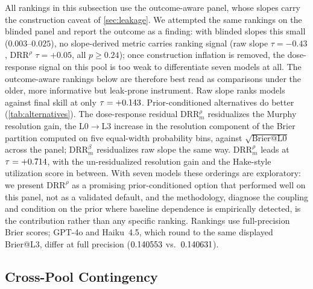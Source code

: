 \documentclass[conference]{IEEEtran}
\theoremstyle{plain}
\theoremstyle{remark}
\begin{document}
All rankings in this subsection use the outcome-aware panel, whose slopes carry the construction caveat of \cref{sec:leakage}. We attempted the same rankings on the blinded panel and report the outcome as a finding: with blinded slopes this small ($0.003$--$0.025$), no slope-derived metric carries ranking signal (raw slope $\tau = -0.43$, $\mathrm{DRR}^{\rho}$ $\tau = +0.05$, all $p \ge 0.24$); once construction inflation is removed, the dose-response signal on this pool is too weak to differentiate seven models at all. The outcome-aware rankings below are therefore best read as comparisons under the older, more informative but leak-prone instrument. Raw slope ranks models against final skill at only $\tau = +0.143$. Prior-conditioned alternatives do better (\cref{tab:alternatives}). The dose-response residual $\mathrm{DRR}^{\rho}_m$ residualizes the Murphy resolution gain, the L0$\to$L3 increase in the resolution component of the Brier partition \citep{murphy1973vector} computed on five equal-width probability bins, against $\sqrt{\mathrm{Brier@L0}}$ across the panel; $\mathrm{DRR}^{\beta}_m$ residualizes raw slope the same way. $\mathrm{DRR}^{\rho}_m$ leads at $\tau = +0.714$, with the un-residualized resolution gain and the Hake-style utilization score in between. With seven models these orderings are exploratory: we present $\mathrm{DRR}^{\rho}$ as a promising prior-conditioned option that performed well on this panel, not as a validated default, and the methodology, diagnose the coupling and condition on the prior where baseline dependence is empirically detected, is the contribution rather than any specific ranking. Rankings use full-precision Brier scores; GPT-4o and Haiku~4.5, which round to the same displayed Brier@L3, differ at full precision ($0.140553$ vs.\ $0.140631$).

\subsection{Cross-Pool Contingency}
\label{sec:pools}
\end{document}
